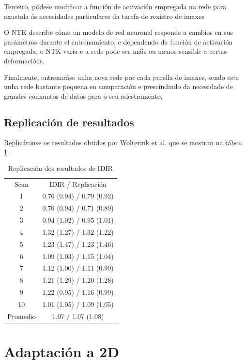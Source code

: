 Terceiro, pódese modificar a función de activación empregada na rede para axustala ás necesidades particulares da tarefa de rexistro de imaxes.

O \gls{NTK} describe cómo un modelo de red neuronal responde a cambios en sus parámetros durante el entrenamiento,
e dependendo da función de activación empregada, o NTK varía e a rede pode ser máis ou menos sensible a certas deformacións.

Finalmente, entrenaráse unha nova rede por cada parella de imaxes, sendo esta unha rede bastante pequena en comparación e prescindindo da necesidade de grandes conxuntos de datos para o seu adestramento.

\subsection{Replicación de resultados}
\label{subsec:Replicación de resultados}

Replicáronse os resultados obtidos por Wolterink et al. \cite{wolterink2021implicit} que se mostran na táboa \ref{tab:comparison}.

\begin{table}[ht]
    \centering
    \caption{Replicación dos resultados de IDIR}
    \begin{tabular}{c|c}
        Scan & {IDIR / Replicación} \\
        1  & 0.76 (0.94) / 0.79 (0.92) \\
        2  & 0.76 (0.94) / 0.71 (0.89) \\
        3  & 0.94 (1.02) / 0.95 (1.01) \\
        4  & 1.32 (1.27) / 1.32 (1.22) \\
        5  & 1.23 (1.47) / 1.23 (1.46) \\
        6  & 1.09 (1.03) / 1.15 (1.04) \\
        7  & 1.12 (1.00) / 1.11 (0.99) \\
        8  & 1.21 (1.29) / 1.20 (1.28) \\
        9  & 1.22 (0.95) / 1.16 (0.99) \\
        10 & 1.01 (1.05) / 1.09 (1.05) \\
        Promedio & 1.07 / 1.07 (1.08) \\
    \end{tabular}
    \label{tab:comparison}
\end{table}

\section{Adaptación a 2D}
\label{sec:Adaptación a 2D}


